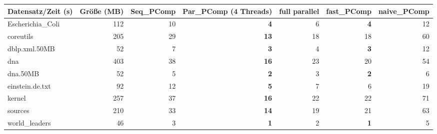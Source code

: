 \documentclass[10pt,a4paper]{standalone}
\begin{document}
	
	
	\begin{tabular}{l|r|r|r|r|r|r}
		Datensatz/Zeit (s) & Größe (MB) & Seq\_PComp & Par\_PComp (4 Threads) & full parallel & fast\_PComp & naive\_PComp \\ \hline
  Escherichia\_Coli & 112 & 10 &  \textbf{4} &  6 & \textbf{4} & 12 \\
          coreutils & 205 & 29 & \textbf{13} & 18 &         18 & 60 \\
      dblp.xml.50MB &  52 &  7 &  \textbf{3} &  4 & \textbf{3} & 12 \\
                dna & 403 & 38 & \textbf{16} & 23 &         20 & 54 \\
           dna.50MB &  52 &  5 &  \textbf{2} &  3 & \textbf{2} &  6 \\
    einstein.de.txt &  92 & 12 &  \textbf{5} &  7 &          6 & 19 \\
             kernel & 257 & 37 & \textbf{16} & 22 &         22 & 71 \\
            sources & 210 & 33 & \textbf{14} & 19 &         21 & 63 \\
     world\_leaders &  46 &  3 &  \textbf{1} &  2 & \textbf{1} &  5 \\
	\end{tabular}
\end{document}
